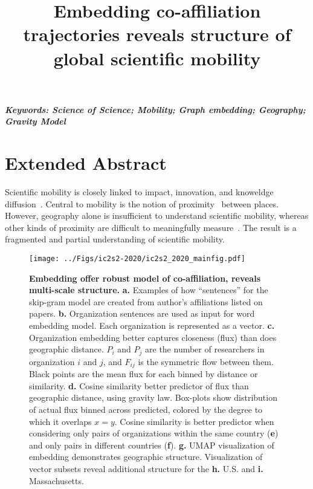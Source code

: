 \documentclass[a4paper,12pt]{article}
\title{Embedding co-affiliation trajectories reveals structure of global scientific mobility}
\author[]{} %
\date{}
\begin{document}
\maketitle
\thispagestyle{fancy}

\vspace{-6em}
\begin{center}
\textbf{\textit{Keywords: Science of Science; Mobility; Graph embedding; Geography; Gravity Model}}
\newline
\end{center}

\section*{Extended Abstract}

Scientific mobility is closely linked to impact, innovation, and knoweldge diffusion~\autocite{sugimoto_scientists_2017, wagner_new_2008}.
Central to mobility is the notion of proximity~\autocite{torre_proximity_2005} between places.
However, geography alone is insufficient to understand scientific mobility, whereas other kinds of proximity are difficult to meaningfully measure~\autocite{boschma_proximity_2005}.
The result is a fragmented and partial understanding of scientific mobility. 

\begin{figure}[h!]
	\centering
	\texttt{[image: ../Figs/ic2s2-2020/ic2s2\_2020\_mainfig.pdf]}
	\caption{ 
	\textbf{Embedding offer robust model of co-affiliation, reveals multi-scale structure.}
	\textbf{a.} Examples of how ``sentences'' for the skip-gram model are created from author's affiliations listed on papers.
	\textbf{b.} Organization sentences are used as input for word embedding model. Each organization is represented as a vector.
	\textbf{c.} Organization embedding better captures closeness (flux) than does geographic distance. 
 $P_{i}$ and $P_{j}$ are the number of researchers in organization $i$ and $j$, and $F_{ij}$ is the symmetric flow between them.
	Black points are the mean flux for each binned by distance or similarity. 
	\textbf{d.} Cosine similarity better predictor of flux than geographic distance, using gravity law.
	Box-plots show distribution of actual flux binned across predicted, colored by the degree to which it overlaps $x = y$. 
	Cosine similarity is better predictor when considering only pairs of organizations within the same country (\textbf{e}) and only pairs in different countries (\textbf{f}). 
	\textbf{g.} UMAP visualization of embedding demonstrates geographic structure.
	Visualization of vector subsets reveal additional structure for the \textbf{h.} U.S. and \textbf{i.} Massachusetts. 
	 }
	\label{fig:image}
\end{figure}
\end{document}
